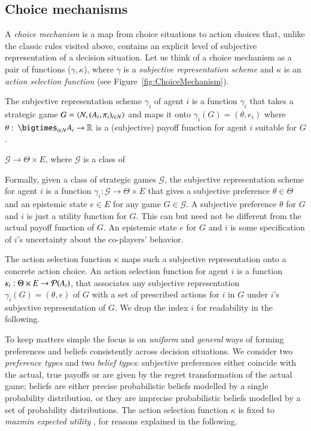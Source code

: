 \documentclass[fleqn,reqno,11pt]{article}
\begin{document}
\subsection{Choice mechanisms}
\label{sec:choice-mechanisms}

A \emph{choice mechanism} is a map from choice situations to action choices that, unlike the
classic rules visited above, contains an explicit level of subjective representation of a
decision situation. Let us think of a choice mechanism as a pair of functions
($\gamma,\kappa$), where $\gamma$ is a \emph{subjective representation scheme} and $\kappa$ is
an \emph{action selection function} (see Figure~\ref{fig:ChoiceMechanism}). 

The subjective representation scheme $\gamma_i$ of agent $i$ is a function $\gamma_i$ that
takes a strategic game $G = \left \langle  N, (A_i , \pi_i)_{i \in N} \right\rangle$ and maps it onto
$\gamma_i(G) = (\theta, e_i)$ where
$\theta \mycolon \bigtimes_{i \in N} A_i \rightarrow \mathbb{R}$ is a (subjective) payoff
function for agent $i$ suitable for $G$.

$\mathcal{G} \rightarrow \Theta \times E$, where $\mathcal{G}$ is a class of 



Formally, given a class of strategic games $\mathcal{G}$, the subjective representation scheme
for agent $i$ is a function $\gamma_i: \mathcal{G} \rightarrow \Theta \times E$ that gives a
subjective preference $\theta \in \Theta$ and an epistemic state $e \in E$ for any game
$G \in \mathcal{G}$. A subjective preference $\theta$ for $G$ and $i$ is just a utility
function for $G$. This can but need not be different from the actual payoff function of $G$. An
epistemic state $e$ for $G$ and $i$ is some specification of $i$'s uncertainty about the
co-players' behavior. 

\bigskip

The action selection function $\kappa$ maps such a subjective representation onto a concrete
action choice. An action selection function for agent $i$ is a function
$\kappa_i: \Theta \times E \rightarrow \mathcal{P}(A_i) $, that associates any subjective
representation $\gamma_i(G) = (\theta,e)$ of $G$ with a set of prescribed actions for $i$ in
$G$ under $i$'s subjective representation of $G$. We drop the index $i$ for readability in the
following.

To keep matters simple the focus is on \emph{uniform} and \emph{general} ways of forming
preferences and beliefs consistently across decision situations. We consider two
\emph{preference types} and two \emph{belief types}: subjective preferences either coincide
with the actual, true payoffs or are given by the regret transformation of the actual game;
beliefs are either precise probabilistic beliefs modelled by a single probability distribution,
or they are imprecise probabilistic beliefs modelled by a set of probability distributions. The
action selection function $\kappa$ is fixed to \textit{maxmin expected utility}
\citep{gilsch89}, for reasons explained in the following.
\end{document}
